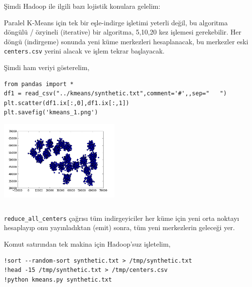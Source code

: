 \documentclass[12pt,fleqn]{article}\usepackage{../../common}
\begin{document}
Şimdi Hadoop ile ilgili bazı lojistik konulara gelelim:

Paralel K-Means için tek bir eşle-indirge işletimi yeterli değil, bu algoritma
döngülü / özyineli (iterative) bir algoritma, 5,10,20 kez işlemesi gerekebilir.
Her döngü (indirgeme) sonunda yeni küme merkezleri hesaplanacak, bu merkezler
eski \verb!centers.csv!  yerini alacak ve işlem tekrar başlayacak.

Şimdi ham veriyi gösterelim,

\begin{verbatim}
from pandas import *
df1 = read_csv("../kmeans/synthetic.txt",comment='#',,sep="   ")
plt.scatter(df1.ix[:,0],df1.ix[:,1])
plt.savefig('kmeans_1.png')
\end{verbatim}

\includegraphics[height=4cm]{kmeans_1.png}

\inputminted[fontsize=\footnotesize]{python}{kmeans.py}

\verb!reduce_all_centers! çağrısı tüm indirgeyiciler her küme için yeni
orta noktayı hesaplayıp onu yayınladıktan (emit) sonra, tüm yeni
merkezlerin geleceği yer.

Komut satırından tek makina için Hadoop'suz işletelim,

\begin{verbatim}
!sort --random-sort synthetic.txt > /tmp/synthetic.txt
!head -15 /tmp/synthetic.txt > /tmp/centers.csv
!python kmeans.py synthetic.txt
\end{verbatim}
\end{document}
